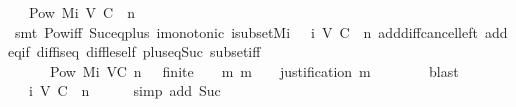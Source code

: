 \begin{isabellebody}
\ {\isachardoublequoteopen}{\isasymsigma}\ {\isasymin}\ Pow\ {\isacharparenleft}Mi\ {\isacharparenleft}V{\isacharcomma}\ C{\isacharcomma}\ {\isasymepsilon}{\isacharparenright}\ {\isacharparenleft}n\ {\isacharminus}\ {}{\isacharparenright}{\isacharparenright}{\isachardoublequoteclose}\isanewline
\ \ \ \ \isamarkupfalse%
\ {\isacartoucheopen}{\isasymsigma}\ {\isasymsubseteq}\ {\isasymsigma}{\isacharprime}{\isacartoucheclose}\isanewline
\ \ \ \ \isamarkupfalse%
\ {\isacharparenleft}smt\ Pow{\isacharunderscore}iff\ Suc{\isacharunderscore}eq{\isacharunderscore}plus{}\ {\isasymSigma}i{\isacharunderscore}monotonic\ {\isasymSigma}i{\isacharunderscore}subset{\isacharunderscore}Mi\ {\isacartoucheopen}{\isasymsigma}{\isacharprime}\ {\isasymin}\ {\isasymSigma}i\ {\isacharparenleft}V{\isacharcomma}\ C{\isacharcomma}\ {\isasymepsilon}{\isacharparenright}\ n{\isacartoucheclose}\ add{\isacharunderscore}diff{\isacharunderscore}cancel{\isacharunderscore}left{\isacharprime}\ add{\isacharunderscore}eq{\isacharunderscore}if\ diff{\isacharunderscore}is{\isacharunderscore}{}{\isacharunderscore}eq\ diff{\isacharunderscore}le{\isacharunderscore}self\ plus{\isacharunderscore}{}{\isacharunderscore}eq{\isacharunderscore}Suc\ subset{\isacharunderscore}iff{\isacharparenright}\isanewline
\ \ \isamarkupfalse%
\ \isamarkupfalse%
\ \ {\isachardoublequoteopen}{\isasymsigma}\ {\isasymin}\ {\isacharbraceleft}{\isasymsigma}\ {\isasymin}\ Pow\ {\isacharparenleft}Mi\ {\isacharparenleft}V{\isacharcomma}C{\isacharcomma}{\isasymepsilon}{\isacharparenright}\ {\isacharparenleft}n\ {\isacharminus}\ {}{\isacharparenright}{\isacharparenright}{\isachardot}\ finite\ {\isasymsigma}\ {\isasymand}\ {\isacharparenleft}{\isasymforall}\ m{\isachardot}\ m\ {\isasymin}\ {\isasymsigma}\ {\isasymlongrightarrow}\ justification\ m\ {\isasymsubseteq}\ {\isasymsigma}{\isacharparenright}{\isacharbraceright}{\isachardoublequoteclose}\isanewline
\ \ \ \ \isamarkupfalse%
\ blast\isanewline
\ \ \isamarkupfalse%
\ \isamarkupfalse%
\ {\isachardoublequoteopen}{\isasymsigma}\ {\isasymin}\ {\isasymSigma}i\ {\isacharparenleft}V{\isacharcomma}\ C{\isacharcomma}\ {\isasymepsilon}{\isacharparenright}\ n{\isachardoublequoteclose}\isanewline
\ \ \ \ \isamarkupfalse%
\ {\isacharparenleft}simp\ add{\isacharcolon}\ Suc{\isacharparenright}\isanewline
\ \ \isamarkupfalse%
\isanewline
{}\isamarkupfalse%
%
\endisatagproof

\end{isabellebody}
